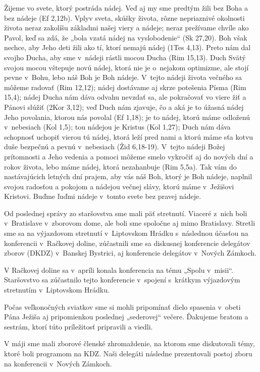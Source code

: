 Žijeme vo svete, ktorý postráda nádej. Veď aj my sme predtým žili bez Boha a bez nádeje (Ef 2,12b). Vplyv sveta, skúšky života, rôzne nepriaznivé okolnosti života neraz zakolíšu základmi našej viery a nádeje; neraz prežívame chvíle ako Pavol, keď sa zdá, že „bola vzatá nádej na vyslobodenie“ (Sk 27,20). Boh však nechce, aby Jeho deti žili ako tí, ktorí nemajú nádej (1Tes 4,13). Preto nám dal svojho Ducha, aby sme v~nádeji rástli mocou Ducha (Rim 15,13). Duch Svätý svojou mocou vštepuje novú nádej, ktorá nie je o~nejakom optimizme, ale stojí pevne v~Bohu, lebo náš Boh je Boh nádeje. V~tejto nádeji života večného sa môžeme radovať (Rim 12,12); nádej dostávame aj skrze potešenia Písma (Rim 15,4); nádej Ducha nám dáva odvahu nevzdať sa, ale pokračovať vo viere žiť a Pánovi slúžiť (2Kor 3,12); veď Duch nám zjavuje, čo a aká je to úžasná nádej Jeho povolania, ktorou nás povolal (Ef 1,18); je to nádej, ktorú máme odloženú v~nebesiach (Kol 1,5); tou nádejou je Kristus (Kol 1,27); Duch nám dáva schopnosť uchopiť vierou tú nádej, ktorá leží pred nami a ktorú máme sťa kotvu duše  bezpečnú a pevnú v~nebesiach (Žid 6,18-19). V~tejto nádeji Božej prítomnosti a Jeho vedenia a pomoci môžeme smelo vykročiť aj do nových dní a rokov života, lebo máme nádej, ktorá nezahanbuje (Rim 5,5a). Tak vám do nastávajúcich letných dní prajem, aby vás náš Boh, ktorý je Boh nádeje, naplnil svojou radosťou a pokojom a nádejou večnej slávy, ktorú máme v~Ježišovi Kristovi. Buďme ľuďmi nádeje v~tomto svete bez pravej nádeje.



Od poslednej správy zo staršovstva sme mali päť stretnutí. Viaceré z~nich boli v~Bratislave v~zborovom dome, ale boli sme spoločne aj mimo Bratislavy. Stretli sme sa na výjazdovom stretnutí v~Liptovskom Hrádku s~následnou účasťou na konferencii v~Račkovej doline, zúčastnili sme sa diskusnej konferencie delegátov zborov (DKDZ) v~Banskej Bystrici, aj konferencie delegátov v~Nových Zámkoch.

V Račkovej doline sa v~apríli konala konferencia na tému „Spolu v~misii“. Staršovstvo sa zúčastnilo tejto konferencie v~spojení s~krátkym výjazdovým stretnutím v~Liptovskom Hrádku.

Počas veľkonočných sviatkov sme si mohli pripomínať dielo spasenia v~obeti Pána Ježiša aj pripomienkou poslednej „sederovej“ večere. Ďakujeme bratom a sestrám, ktorí túto príležitosť pripravili a viedli.

V máji sme mali zborové členské zhromaždenie, na ktorom sme diskutovali témy, ktoré boli programom na KDZ. Naši delegáti následne prezentovali postoj zboru na konferencii v~Nových Zámkoch.

